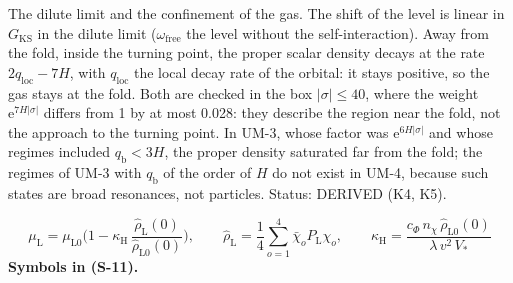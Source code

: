\documentclass[
  10pt,
]{article}
\begin{document}
The dilute limit and the confinement of the gas. The shift of the level
is linear in \(G_{\mathrm{KS}}\) in the dilute limit
(\(\omega_{\mathrm{free}}\) the level without the self-interaction).
Away from the fold, inside the turning point, the proper scalar density
decays at the rate \(2q_{\mathrm{loc}} - 7H\), with \(q_{\mathrm{loc}}\)
the local decay rate of the orbital: it stays positive, so the gas stays
at the fold. Both are checked in the box \(\lvert\sigma\rvert \le 40\),
where the weight \(\mathrm{e}^{7H\lvert\sigma\rvert}\) differs from 1 by
at most 0.028: they describe the region near the fold, not the approach
to the turning point. In UM-3, whose factor was
\(\mathrm{e}^{6H\lvert\sigma\rvert}\) and whose regimes included
\(q_{\mathrm{b}} < 3H\), the proper density saturated far from the fold;
the regimes of UM-3 with \(q_{\mathrm{b}}\) of the order of \(H\) do not
exist in UM-4, because such states are broad resonances, not particles.
Status: DERIVED (K4, K5).

\[
\mu_{\mathrm{L}} = \mu_{\mathrm{L}0}\Big(1 - \kappa_{\mathrm{H}}\,\frac{\hat\rho_{\mathrm{L}}(0)}{\hat\rho_{\mathrm{L}0}(0)}\Big),\qquad
\hat\rho_{\mathrm{L}} = \frac14\sum_{o=1}^{4}\bar\chi_oP_{\mathrm{L}}\chi_o,\qquad
\kappa_{\mathrm{H}} = \frac{c_\Phi\,n_\chi\,\hat\rho_{\mathrm{L}0}(0)}{\lambda\,v^2\,V_*} \tag{S-11}
\] \textbf{Symbols in (S-11).}
\end{document}
